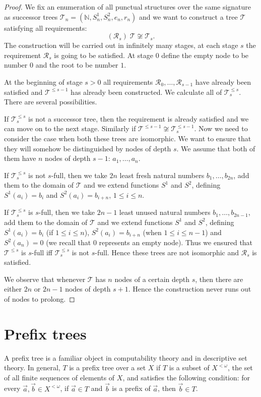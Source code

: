 \documentclass[a4paper,UKenglish,cleveref, autoref, thm-restate]{lipics-v2021}
\begin{document}
\begin{proof}
    We fix an enumeration of all punctual structures over the same signature as successor trees $\mathcal{T}_n=(\mathbb{N},S^1_n,S^2_n,e_n,r_n)$ and we want to construct a tree $\mathcal{T}$ satisfying all requirements:
    \[
    (\mathcal{R}_s) \; \mathcal{T} \not \cong \mathcal{T}_s. 
    \]
    The construction will be carried out in infinitely many stages, at each stage $s$ the requirement $\mathcal{R}_s$ is going to be satisfied. At stage $0$ define the empty node to be number $0$ and the root to be number $1$.

    At the beginning of stage $s>0$ all requirements $\mathcal{R}_0, \dots, \mathcal{R}_{s-1}$ have already been satisfied and $\mathcal{T}^{\leq s-1}$ has already been constructed. We calculate all of $\mathcal{T}_s^{\leq s}$. There are several possibilities.

    If $\mathcal{T}_s^{\leq s}$ is not a successor tree, then the requirement is already satisfied and we can move on to the next stage. Similarly if $\mathcal{T}^{\leq s-1} \not \cong \mathcal{T}_s^{\leq s-1}$. Now we need to consider the case when both these trees are isomorphic. We want to ensure that they will somehow be distinguished by nodes of depth $s$. We assume that both of them have $n$ nodes of depth $s-1$: $a_1, \dots, a_{n}$.
    
    If $\mathcal{T}_s^{\leq s}$ is not $s$-full, then we take $2n$ least fresh natural numbers $b_1, \dots, b_{2n}$, add them to the domain of $\mathcal{T}$ and we extend functions $S^1$ and $S^2$, defining $S^1(a_i)=b_i$ and $S^2(a_i)=b_{i+n}$, $1 \leq i \leq n$.

    If $\mathcal{T}_s^{\leq s}$ is $s$-full, then we take $2n-1$ least unused natural numbers $b_1, \dots, b_{2n-1}$, add them to the domain of $\mathcal{T}$ and we extend functions $S^1$ and $S^2$, defining $S^1(a_i)=b_i$ (if $1 \leq i \leq n$), $S^2(a_i)=b_{i+n}$ (when $1 \leq i \leq n-1$) and $S^2(a_n)=0$ (we recall that $0$ represents an empty node). Thus we ensured that $\mathcal{T}^{\leq s}$ is $s$-full iff $\mathcal{T}_s^{\leq s}$ is not $s$-full. Hence these trees are not isomorphic and $\mathcal{R}_s$ is satisfied.

    We observe that whenever $\mathcal{T}$ has $n$ nodes of a certain depth $s$, then there are either $2n$ or $2n-1$ nodes of depth $s+1$. Hence the construction never runs out of nodes to prolong.
\end{proof}

\section{Prefix trees}\label{app:pref-trees}
A prefix tree is a familiar object in computability theory and in descriptive set theory. In general, $T$ is a prefix tree over a set $X$ if $T$ is a subset of $X^{<\omega}$, the set of all finite sequences of elements of $X$, and satisfies the following condition: for every $\vec a, \vec b \in X^{<\omega}$, if $\vec a \in T$ and $\vec b$ is a prefix of $\vec a$, then $\vec b \in T$.
\end{document}
